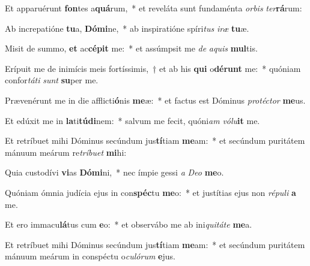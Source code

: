 \item Et apparuérunt \textbf{fon}tes a\textbf{quá}rum,~* et reveláta sunt fundaménta \textit{or}\textit{bis} \textit{ter}\textbf{rá}rum:
\item Ab increpatióne \textbf{tu}a, \textbf{Dó}\textbf{mi}ne,~* ab inspiratióne spíri\textit{tus} \textit{i}\textit{ræ} \textbf{tu}æ.
\item Misit de summo, \textbf{et} ac\textbf{cé}\textbf{pit} me:~* et assúmpsit me \textit{de} \textit{a}\textit{quis} \textbf{mul}tis.
\item Erípuit me de inimícis meis fortíssimis,~† et ab his \textbf{qui} o\textbf{dé}\textbf{runt} me:~* quóniam confor\textit{tá}\textit{ti} \textit{sunt} \textbf{su}per me.
\item Prævenérunt me in die afflicti\textbf{ó}nis \textbf{me}æ:~* et factus est Dóminus \textit{pro}\textit{téc}\textit{tor} \textbf{me}us.
\item Et edúxit me in \textbf{la}ti\textbf{tú}\textbf{di}nem:~* salvum me fecit, quóni\textit{am} \textit{vó}\textit{lu}\textbf{it} me.
\item Et retríbuet mihi Dóminus secúndum jus\textbf{tí}tiam \textbf{me}am:~* et secúndum puritátem mánuum meárum re\textit{trí}\textit{bu}\textit{et} \textbf{mi}hi:
\item Quia custodívi \textbf{vi}as \textbf{Dó}\textbf{mi}ni,~* nec ímpie gessi \textit{a} \textit{De}\textit{o} \textbf{me}o.
\item Quóniam ómnia judícia ejus in con\textbf{spéc}tu \textbf{me}o:~* et justítias ejus non \textit{ré}\textit{pu}\textit{li} \textbf{a} me.
\item Et ero immacu\textbf{lá}tus cum \textbf{e}o:~* et observábo me ab ini\textit{qui}\textit{tá}\textit{te} \textbf{me}a.
\item Et retríbuet mihi Dóminus secúndum jus\textbf{tí}tiam \textbf{me}am:~* et secúndum puritátem mánuum meárum in conspéctu o\textit{cu}\textit{ló}\textit{rum} \textbf{e}jus.

